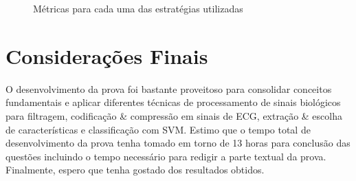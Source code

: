 \documentclass{article}
\begin{document}
\begin{figure}[H]
\center
{}
\qquad
{}
\qquad
{}
\caption{Métricas para cada uma das estratégias utilizadas}
\label{fig:Q5_M}
\end{figure}

\section*{Considerações Finais}
O desenvolvimento da prova foi bastante proveitoso para consolidar conceitos fundamentais e aplicar diferentes técnicas de processamento de sinais biológicos para filtragem, codificação \& compressão em sinais de ECG, extração \& escolha de características e classificação com SVM. Estimo que o tempo total de desenvolvimento da prova tenha tomado em torno de 13 horas para conclusão das questões incluindo o tempo necessário para redigir a parte textual da prova. Finalmente, espero que tenha gostado dos resultados obtidos.
\end{document}
